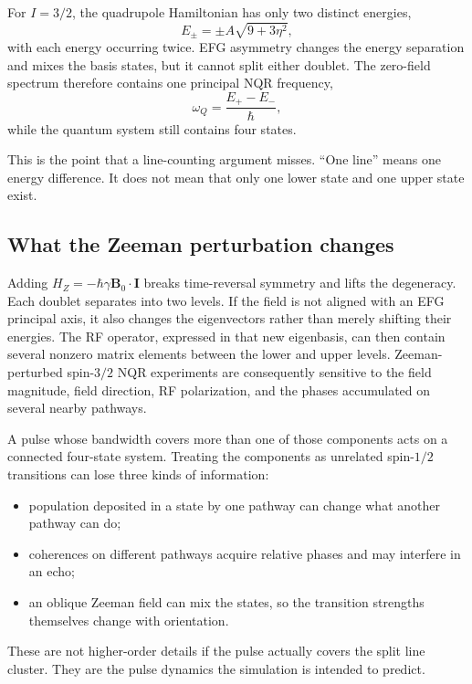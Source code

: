 \documentclass[11pt,letterpaper]{article}
\begin{document}
For $I=3/2$, the quadrupole Hamiltonian has only two distinct energies,
\begin{equation}
E_{\pm}=\pm A\sqrt{9+3\eta^2},
\label{eq:spin32energy}
\end{equation}
with each energy occurring twice. EFG asymmetry changes the energy separation and mixes the basis states, but it cannot split either doublet. The zero-field spectrum therefore contains one principal NQR frequency,
\begin{equation}
\omega_Q=\frac{E_+-E_-}{\hbar},
\end{equation}
while the quantum system still contains four states.

This is the point that a line-counting argument misses. ``One line'' means one energy difference. It does not mean that only one lower state and one upper state exist.

\subsection{What the Zeeman perturbation changes}

Adding $H_Z=-\hbar\gamma\mathbf B_0\cdot\mathbf I$ breaks time-reversal symmetry and lifts the degeneracy. Each doublet separates into two levels. If the field is not aligned with an EFG principal axis, it also changes the eigenvectors rather than merely shifting their energies. The RF operator, expressed in that new eigenbasis, can then contain several nonzero matrix elements between the lower and upper levels. Zeeman-perturbed spin-$3/2$ NQR experiments are consequently sensitive to the field magnitude, field direction, RF polarization, and the phases accumulated on several nearby pathways.\cite{panguluri2006,teles2015}

A pulse whose bandwidth covers more than one of those components acts on a connected four-state system. Treating the components as unrelated spin-$1/2$ transitions can lose three kinds of information:
\begin{itemize}
\item population deposited in a state by one pathway can change what another pathway can do;
\item coherences on different pathways acquire relative phases and may interfere in an echo;
\item an oblique Zeeman field can mix the states, so the transition strengths themselves change with orientation.
\end{itemize}
These are not higher-order details if the pulse actually covers the split line cluster. They are the pulse dynamics the simulation is intended to predict.
\end{document}
